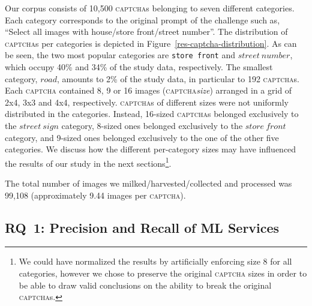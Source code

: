 \documentclass[sigconf,review,anonymous]{acmart}
\newcommand{\captcha}{\textsc{captcha}\xspace}
\newcommand{\captchas}{\textsc{captcha}s\xspace}
\begin{document}
Our corpus consists of 10,500 \captchas belonging to seven different categories. 
Each category corresponds to the original prompt of the challenge such as, ``Select all images with house/store front/street number''. 
The distribution of \captchas per categories is depicted in Figure~\ref{res-captcha-distribution}.
As can be seen, the two most popular categories are \texttt{store~front} and $street~number$, which occupy 40\% and 34\% of the study data, respectively.
The smallest category, $road$, amounts to 2\% of the study data, in particular to 192 \captchas.
Each \captcha contained 8, 9 or 16 images (\captcha \textit{size}) arranged in a grid of 2x4, 3x3 and 4x4, respectively. 
\captchas of different sizes were not uniformly distributed in the categories. 
Instead, 16-sized \captchas belonged exclusively to the $street~sign$ category, 8-sized ones belonged exclusively to the $store~front$ category, 
and 9-sized ones belonged exclusively to the one of the other five categories. 
We discuss how the different per-category sizes may have influenced the results of our study in the next sections\footnote{We could have normalized the results by artificially enforcing size 8 for all categories, however we chose to preserve the original \captcha sizes in order to be able to draw valid conclusions on the ability to break the original \captchas.}.

The total number of images we milked/harvested/collected and processed was 99,108 (approximately 9.44 images per \captcha).

\subsection{RQ~1: Precision and Recall of ML Services}
\end{document}
